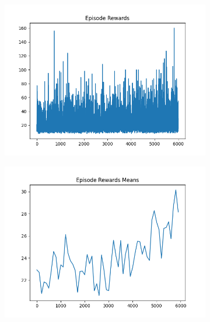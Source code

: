 \begin{figure}[H]
\begin{subfigure}{.47\linewidth}
        \includegraphics[width=\textwidth]{pole/2024-06-14_17-31-42_dqn_cartpole_episode_rewards.png}
    \end{subfigure}
    \begin{subfigure}{.47\linewidth}
        \centering
        \includegraphics[width=\textwidth]{pole/2024-06-14_17-31-42_dqn_cartpole_episode_rewards_means.png}
    \end{subfigure}
\end{figure}
